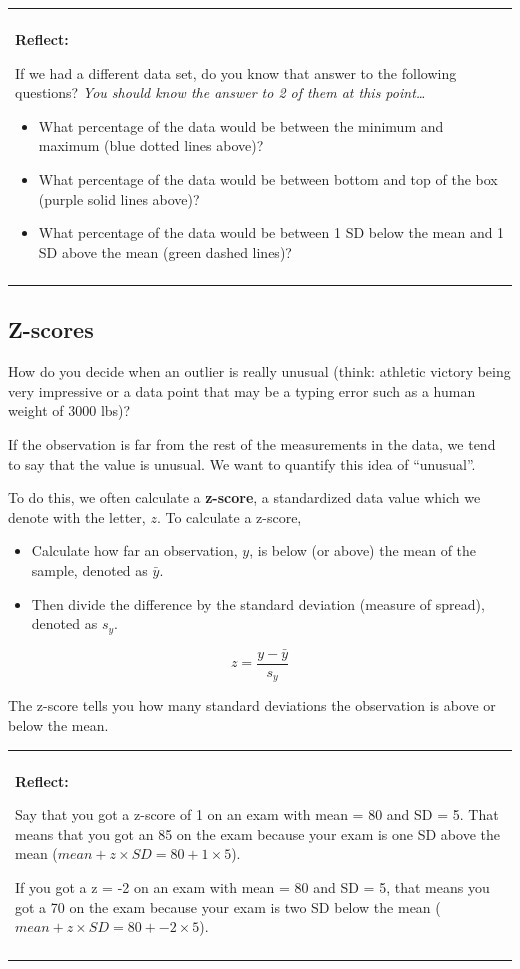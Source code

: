 \documentclass[
]{book}
\providecommand{\tightlist}{%
  \setlength{\itemsep}{0pt}\setlength{\parskip}{0pt}}
\newenvironment{reflect}
{
    \begin{center}
    
    \begin{tabular}{|p{0.8\textwidth}|}
    \rowcolor{LightBlue}
    \hline\\
    \rowcolor{LightBlue}
    \textbf{Reflect:}
}
{
    \\\rowcolor{LightBlue}
    \\\hline
    \end{tabular} 
    \end{center}
}
\begin{document}
\begin{reflect}
If we had a different data set, do you know that answer to the following
questions? \emph{You should know the answer to 2 of them at this
point\ldots{}}

\begin{itemize}
\item
  What percentage of the data would be between the minimum and maximum
  (blue dotted lines above)?
\item
  What percentage of the data would be between bottom and top of the box
  (purple solid lines above)?
\item
  What percentage of the data would be between 1 SD below the mean and 1
  SD above the mean (green dashed lines)?
\end{itemize}
\end{reflect}

\subsection{Z-scores}\label{z-scores}

How do you decide when an outlier is really unusual (think: athletic victory being very impressive or a data point that may be a typing error such as a human weight of 3000 lbs)?

If the observation is far from the rest of the measurements in the data, we tend to say that the value is unusual. We want to quantify this idea of ``unusual''.

To do this, we often calculate a \textbf{z-score}, a standardized data value which we denote with the letter, \(z\). To calculate a z-score,

\begin{itemize}
\tightlist
\item
  Calculate how far an observation, \(y\), is below (or above) the mean of the sample, denoted as \(\bar{y}\).
\item
  Then divide the difference by the standard deviation (measure of spread), denoted as \(s_y\).
\end{itemize}

\[ z = \frac{y - \bar{y}}{s_y} \]

The z-score tells you how many standard deviations the observation is above or below the mean.

\begin{reflect}
Say that you got a z-score of 1 on an exam with mean = 80 and SD = 5.
That means that you got an 85 on the exam because your exam is one SD
above the mean (\(mean + z \times SD = 80 + 1 \times 5\)).

If you got a z = -2 on an exam with mean = 80 and SD = 5, that means you
got a 70 on the exam because your exam is two SD below the mean
(\(mean + z \times SD = 80 + -2 \times 5\)).
\end{reflect}
\end{document}
